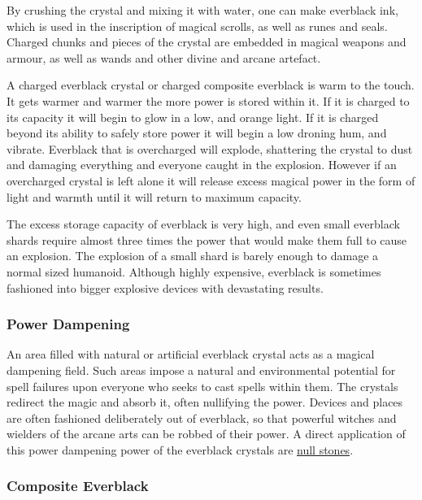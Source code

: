 By crushing the crystal and mixing it with water, one can make everblack ink,
which is used in the inscription of magical scrolls, as well as runes and
seals. Charged chunks and pieces of the crystal are embedded in magical
weapons and armour, as well as wands and other divine and arcane artefact.

A charged everblack crystal or charged composite everblack is warm to the touch.
It gets warmer and warmer the more power is stored within it. If it is charged
to its capacity it will begin to glow in a low, and orange light. If it is
charged beyond its ability to safely store power it will begin a low droning
hum, and vibrate. Everblack that is overcharged will explode, shattering the
crystal to dust and damaging everything and everyone caught in the explosion.
However if an overcharged crystal is left alone it will release excess magical
power in the form of light and warmth until it will return to maximum
capacity.

The excess storage capacity of everblack is very high, and even small
everblack shards require almost three times the power that would make them
full to cause an explosion. The explosion of a small shard is barely enough to
damage a normal sized humanoid. Although highly expensive, everblack is
sometimes fashioned into bigger explosive devices with devastating results.


\subsubsection{Power Dampening}

An area filled with natural or artificial everblack crystal acts as a magical
dampening field. Such areas impose a natural and environmental potential for
spell failures upon everyone who seeks to cast spells within them. The
crystals redirect the magic and absorb it, often nullifying the power.
Devices and places are often fashioned deliberately out of everblack, so that
powerful witches and wielders of the arcane arts can be robbed of their power.
A direct application of this power dampening power of the everblack crystals
are \hyperref[sec:Null Stone]{null stones}.

\subsubsection{Composite Everblack}
\label{sec:Composite Everblack}

